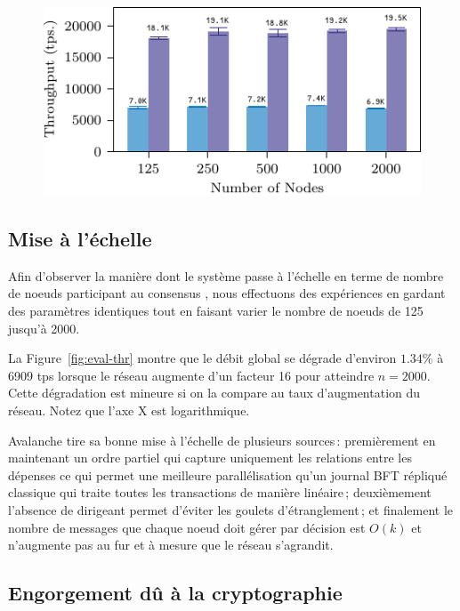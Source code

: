 \begin{figure}
\includegraphics[width=\linewidth]{figures/thr-raw.pdf}
\label{fig:eval-thr-raw}
\end{figure}

\subsection{Mise à l'échelle}

Afin d'observer la manière dont le système passe à l'échelle en terme de nombre de noeuds participant au consensus
{\sysname}, nous effectuons des expériences en gardant des paramètres identiques tout en faisant varier le
nombre de noeuds de 125 jusqu'à 2000.

La Figure~\ref{fig:eval-thr} montre que le débit global se dégrade d'environ $1.34\%$ à 6909 tps lorsque le
réseau augmente d'un facteur 16 pour atteindre $n = 2000$. Cette dégradation est mineure si on la compare au
taux d'augmentation du réseau. Notez que l'axe X est logarithmique.

Avalanche tire sa bonne mise à l'échelle de plusieurs sources\,: premièrement en maintenant un ordre partiel qui
capture uniquement les relations entre les dépenses ce qui permet une meilleure parallélisation qu'un journal
BFT répliqué classique qui traite toutes les transactions de manière linéaire\,; deuxièmement l'absence de dirigeant
permet d'éviter les goulets d'étranglement\,; et finalement le nombre de messages que chaque noeud doit gérer par
décision est $O(k)$ et n'augmente pas au fur et à mesure que le réseau s'agrandit.

\subsection{Engorgement dû à la cryptographie}

